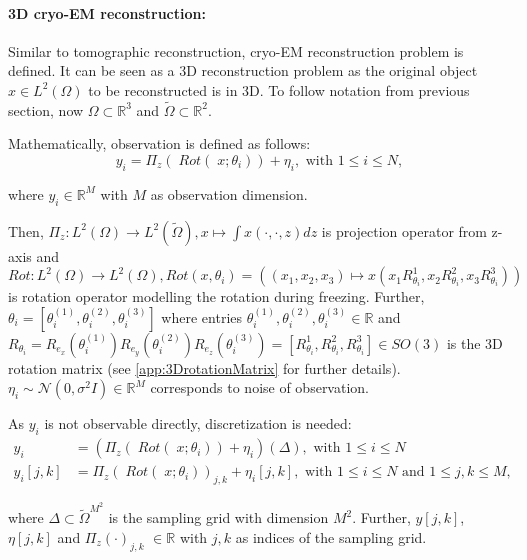 \paragraph{3D cryo-EM reconstruction:}
Similar to tomographic reconstruction, cryo-EM reconstruction problem \cite{cryoEmMath} is defined.
It can be seen as a 3D reconstruction problem as the original object $x \in L^2(\Omega)$ to be reconstructed is in 3D.
To follow notation from previous section, now $\Omega \subset \mathbb{R}^3 $ and $\tilde{\Omega} \subset \mathbb{R}^2 $.

Mathematically, observation is defined as follows:
\begin{equation}
    \label{eq:cryoEmSimple}
    y_i = \Pi_z  (\; Rot (\;x; \theta_i )) + \eta_i, \text{ with } 1 \leq i \leq N,
\end{equation}

where $y_i \in \mathbb{R}^M$ with $M$ as observation dimension.

Then, $\Pi_z : L^2(\Omega) \to L^2(\tilde{\Omega}), x \mapsto  \int x(\cdot,\cdot,z) dz$ is projection operator from z-axis
and 
$Rot : L^2(\Omega) \to L^2(\Omega), Rot(x, \theta_i) = \left((x_1,x_2,x_3) \mapsto x( x_1R^1_{\theta_i}, x_2R^2_{\theta_i}, x_3R^3_{\theta_i})\right)$ is rotation operator modelling the rotation during freezing.
Further, $\theta_i = [\theta_i^{(1)}, \theta_i^{(2)}, \theta_i^{(3)} ] $ where entries $ \theta_i^{(1)}, \theta_i^{(2)}, \theta_i^{(3)} \in \mathbb{R}$ and 
$R_{\theta_i} =  R_{e_x} (\theta_i^{(1)}) R_{e_y} (\theta_i^{(2)}) R_{e_z} (\theta_i^{(3)}) = [R^1_{\theta_i}, R^2_{\theta_i}, R^3_{\theta_i}] \in SO(3)$ is the 3D rotation matrix 
(see \ref{app:3DrotationMatrix} for further details). 
$\eta_i \sim \mathcal{N}(0,\sigma^2I) \in \mathbb{R}^M$ corresponds to noise of observation.


As $y_i$ is not observable directly, discretization is needed:
\begin{equation}
    \label{eq:cryoEmSimpleDiscrete}
    \begin{aligned}
        y_i &= \left( \Pi_z (\; Rot (\;x; \theta_i)) + \eta_i\right)(\Delta), \text{ with } 1 \leq i \leq N \\
        y_i[j,k] &= \Pi_z (\; Rot(\;x; \theta_i))_{j,k} + \eta_i[j,k], \text{ with } 1 \leq i \leq N \text{ and } 1 \leq j,k \leq M,
    \end{aligned}
\end{equation}

where $\Delta \subset \tilde{\Omega}^{M^2}$ is the sampling grid with dimension $M^2$.
Further, $y[j,k]$, $\eta[j,k]$ and $\Pi_z(\cdot)_{j,k}$ $ \in \mathbb{R}$ with $j,k$ as indices of 
the sampling grid.



